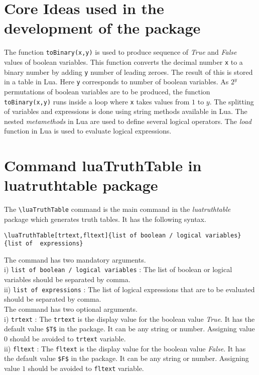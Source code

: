 \documentclass{article}
\begin{document}
\section{Core Ideas used in the development of the package} The function \verb|toBinary(x,y)| is used to produce sequence of \emph{True} and \emph{False} values  of boolean variables. This function converts the decimal number \verb|x| to a binary number by adding \verb|y| number of leading zeroes. The result of this is stored in a table in Lua.  Here \verb|y| corresponds to number of boolean variables. As  \(2^y\) permutations of boolean variables are to be produced, the function \verb|toBinary(x,y)| runs inside a loop where  \verb|x|  takes values from \(1\) to \(y\). The splitting of variables and expressions is done using string methods available in Lua. The nested \emph{metamethods} in Lua are used to define several logical operators. The \emph{load} function in Lua is used to evaluate logical expressions. 
\section{Command luaTruthTable in luatruthtable package}
The \verb|\luaTruthTable| command is the main command in the \emph{luatruthtable} package which generates truth tables. It has the following syntax.
\begin{lstlisting}
\luaTruthTable[trtext,fltext]{list of boolean / logical variables}{list of  expressions}
\end{lstlisting}
The command has two mandatory arguments. \\
i) \verb|list of boolean / logical variables| : The list of boolean or logical variables should be separated by comma.  \\
ii) \verb|list of expressions| : The list of logical expressions that are to be evaluated should be separated by comma. \\
The command has two optional arguments. \\
i) \verb|trtext| : The \verb|trtext| is the display value for the boolean value \emph{True}. It has the default value \verb|$T$| in the package. It can be any string or number.  Assigning value \(0\) should be avoided to  \verb|trtext| variable.   \\
ii) \verb|fltext| : The \verb|fltext| is the display value for the boolean value \emph{False}. It has the default value \verb|$F$| in the package. It can be any string or number.  Assigning value \(1\) should be avoided to  \verb|fltext| variable.  
\end{document}
